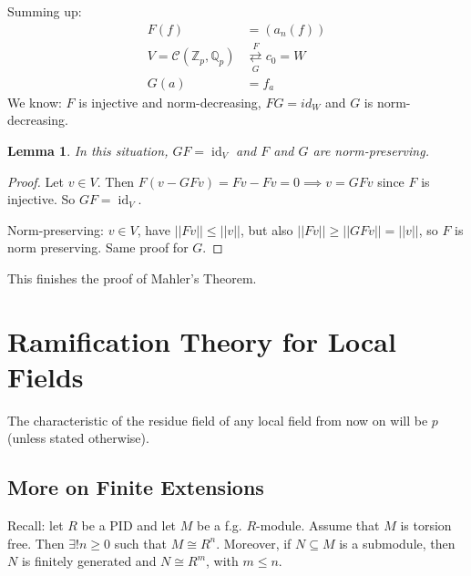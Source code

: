 \documentclass[a4paper]{article}
\newtheorem{lemma}[definition]{Lemma}
\newcommand*\abs[1]{\left|#1\right|}
\newcommand*\norm[1]{\abs{\abs{#1}}}
\DeclareMathOperator{\id}{id}
\begin{document}
Summing up:
\begin{align*}
	F(f) &= (a_n(f)) \\
	V = \mathcal{C}(\mathbb{Z}_p, \mathbb{Q}_p) &\underset{G}{\overset{F}{\rightleftarrows}} c_0 = W \\
	G(a) &= f_a
\end{align*}
We know: $F$ is injective and norm-decreasing,
$FG = id_W$ and $G$ is norm-decreasing.

\begin{lemma}
	In this situation,
	$GF = \id_V$ and $F$ and $G$ are norm-preserving.
\end{lemma}
\begin{proof}
	Let $v \in V$.
	Then $F(v-GFv) = Fv - Fv = 0 \implies v = GFv$ since $F$ is injective.
	So $GF = \id_V$.
	
	Norm-preserving: $v \in V$,
	have $\norm{Fv} \leq \norm{v}$,
	but also $\norm{Fv} \geq \norm{GFv} = \norm{v}$,
	so $F$ is norm preserving.
	Same proof for $G$.
\end{proof}

This finishes the proof of Mahler's Theorem.

\section{Ramification Theory for Local Fields}

The characteristic of the residue field of any local field from now on will be $p$ (unless stated otherwise).

\subsection{More on Finite Extensions}

Recall: let $R$ be a PID and let $M$ be a f.g. $R$-module.
Assume that $M$ is torsion free.
Then $\exists! n \geq 0$ such that $M \cong R^n$.
Moreover, if $N \subseteq M$ is a submodule,
then $N$ is finitely generated and $N \cong R^m$, with $m \leq n$.
\end{document}
